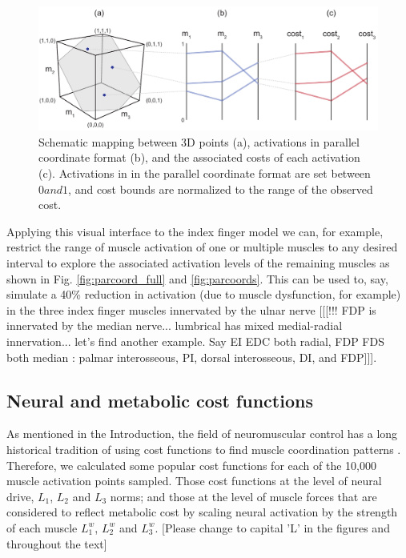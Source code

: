 \begin{figure}[ht]
  \centering
  \includegraphics[width=1.0\textwidth]{sections/figs/3d_points_to_parcoords.pdf}
  \caption{Schematic mapping between 3D points (a), activations in parallel coordinate format (b), and the associated costs of each activation (c).
Activations in in the parallel coordinate format are set between $0 and 1$, and cost bounds are normalized to the range of the observed cost.}
  \label{fig:points_to_parcoords_mapping}
\end{figure}


Applying this visual interface to the index finger model  we can, for example,  restrict the range of muscle activation of one or multiple muscles to any desired interval to explore the associated activation levels of the remaining muscles as shown in Fig. \ref{fig:parcoord_full} and \ref{fig:parcoords}.
This can be used to, say, simulate  a 40\% reduction in activation (due to muscle dysfunction, for example) in the three index finger muscles innervated by the ulnar nerve [[[!!! FDP is  innervated by the median nerve... lumbrical has mixed medial-radial innervation... let's find another example. Say EI EDC both radial, FDP FDS both median : palmar interosseous, PI, dorsal interosseous, DI, and FDP]]]. 

\subsection*{Neural and metabolic  cost functions}

As mentioned in the Introduction, the field of neuromuscular control has a long historical tradition of using cost functions to find muscle coordination patterns \cite{valero-cuevas2015fundamentals,Prilutsky2000Musclecrowninshield1981physiologically}. Therefore, we calculated some  popular cost functions for each of the 10,000 muscle activation points sampled. Those cost functions at the level of neural drive, $L_1$, $L_2$ and $L_3$ norms; and those at the level of muscle forces that are considered to reflect metabolic cost  by scaling neural activation by the strength of each muscle  $L_1^w$, $L_2^w$ and $L_3^w$. [Please change to capital 'L' in the figures and throughout the text]


